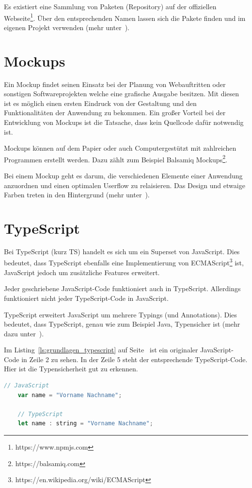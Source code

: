 Es existiert eine Sammlung von Paketen (Repository) auf der offiziellen Webseite\footnote{https://www.npmjs.com}. Über
den entsprechenden Namen lassen sich die Pakete finden und im eigenen Projekt verwenden
(mehr unter~\cite{book_grundlagen_npm}).

\section{Mockups}
Ein Mockup findet seinen Einsatz bei der Planung von Webauftritten oder sonstigen Softwareprojekten welche eine
grafische Ausgabe besitzen. Mit diesen ist es möglich einen ersten Eindruck von der Gestaltung und den Funktionalitäten
der Anwendung zu bekommen. Ein großer Vorteil bei der Entwicklung von Mockups ist die Tatsache, dass kein Quellcode
dafür notwendig ist.

Mockups können auf dem Papier oder auch Computergestützt mit zahlreichen Programmen erstellt werden. Dazu zählt zum
Beispiel Balsamiq Mockups\footnote{https://balsamiq.com}.

Bei einem Mockup geht es darum, die verschiedenen Elemente einer Anwendung anzuordnen und einen optimalen Userflow
zu relaisieren. Das Design und etwaige Farben treten in den Hintergrund (mehr unter~\cite{book_grundlagen_mockups}).

\section{TypeScript}
Bei TypeScript (kurz TS) handelt es sich um ein Superset von JavaScript. Dies bedeutet, dass TypeScript ebenfalls eine
Implementierung von ECMAScript\footnote{https://en.wikipedia.org/wiki/ECMAScript} ist, JavaScript jedoch um zusätzliche
Features erweitert.

Jeder geschriebene JavaScript-Code funktioniert auch in TypeScript. Allerdings funktioniert nicht jeder TypeScript-Code
in JavaScript.

TypeScript erweitert JavaScript um mehrere Typings (und Annotations). Dies bedeutet, dass TypeScript, genau wie zum
Beispiel Java, Typensicher ist (mehr dazu unter~\cite{book_grundlagen_typescript}).

Im Listing~\ref{ls:grundlagen_typescript} auf Seite~\pageref{ls:grundlagen_typescript} ist ein originaler
JavaScript-Code in Zeile 2 zu sehen. In der Zeile 5 steht der entsprechende TypeScript-Code. Hier ist die
Typensicherheit gut zu erkennen.

\begin{lstlisting}[language=JavaScript, caption=Unterschied zwischen JavaScript und TypeScript, label=ls:grundlagen_typescript]
    // JavaScript
    var name = "Vorname Nachname";

    // TypeScript
    let name : string = "Vorname Nachname";
\end{lstlisting}

